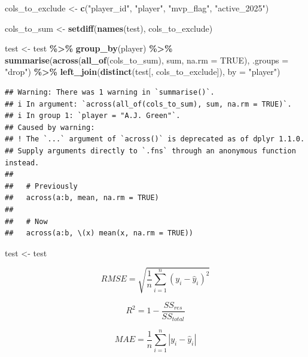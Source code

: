\documentclass[
  11pt,
]{article}
\newenvironment{Shaded}{\begin{snugshade}}{\end{snugshade}}
\newcommand{\AttributeTok}[1]{\textcolor[rgb]{0.13,0.29,0.53}{#1}}
\newcommand{\ConstantTok}[1]{\textcolor[rgb]{0.56,0.35,0.01}{#1}}
\newcommand{\FunctionTok}[1]{\textcolor[rgb]{0.13,0.29,0.53}{\textbf{#1}}}
\newcommand{\NormalTok}[1]{#1}
\newcommand{\OtherTok}[1]{\textcolor[rgb]{0.56,0.35,0.01}{#1}}
\newcommand{\SpecialCharTok}[1]{\textcolor[rgb]{0.81,0.36,0.00}{\textbf{#1}}}
\newcommand{\StringTok}[1]{\textcolor[rgb]{0.31,0.60,0.02}{#1}}
\begin{document}
\begin{Shaded}
\begin{Highlighting}[]
\NormalTok{cols\_to\_exclude }\OtherTok{\textless{}{-}} \FunctionTok{c}\NormalTok{(}\StringTok{"player\_id"}\NormalTok{, }\StringTok{"player"}\NormalTok{, }\StringTok{"mvp\_flag"}\NormalTok{, }\StringTok{"active\_2025"}\NormalTok{)}

\NormalTok{cols\_to\_sum }\OtherTok{\textless{}{-}} \FunctionTok{setdiff}\NormalTok{(}\FunctionTok{names}\NormalTok{(test), cols\_to\_exclude)}

\NormalTok{test }\OtherTok{\textless{}{-}}\NormalTok{ test }\SpecialCharTok{\%\textgreater{}\%}
  \FunctionTok{group\_by}\NormalTok{(player) }\SpecialCharTok{\%\textgreater{}\%}
  \FunctionTok{summarise}\NormalTok{(}\FunctionTok{across}\NormalTok{(}\FunctionTok{all\_of}\NormalTok{(cols\_to\_sum), sum, }\AttributeTok{na.rm =} \ConstantTok{TRUE}\NormalTok{), }\AttributeTok{.groups =} \StringTok{"drop"}\NormalTok{) }\SpecialCharTok{\%\textgreater{}\%}
  \FunctionTok{left\_join}\NormalTok{(}\FunctionTok{distinct}\NormalTok{(test[, cols\_to\_exclude]), }\AttributeTok{by =} \StringTok{"player"}\NormalTok{)}
\end{Highlighting}
\end{Shaded}

\begin{verbatim}
## Warning: There was 1 warning in `summarise()`.
## i In argument: `across(all_of(cols_to_sum), sum, na.rm = TRUE)`.
## i In group 1: `player = "A.J. Green"`.
## Caused by warning:
## ! The `...` argument of `across()` is deprecated as of dplyr 1.1.0.
## Supply arguments directly to `.fns` through an anonymous function instead.
## 
##   # Previously
##   across(a:b, mean, na.rm = TRUE)
## 
##   # Now
##   across(a:b, \(x) mean(x, na.rm = TRUE))
\end{verbatim}

\begin{Shaded}
\begin{Highlighting}[]
\NormalTok{test }\OtherTok{\textless{}{-}}\NormalTok{ test}
\end{Highlighting}
\end{Shaded}

\[RMSE = \sqrt{\frac{1}{n} \sum_{i=1}^{n}(y_i - \hat{y}_i)^2}\]

\[R^2 = 1- \frac{SS_{res}}{SS_{total}}\]

\[MAE = \frac{1}{n} \sum_{i=1}^{n} |y_i - \hat{y}_i|\]
\end{document}
